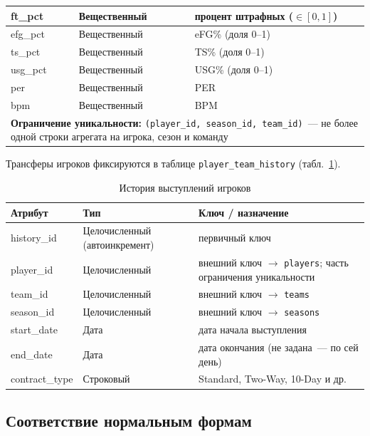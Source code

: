 {\begin{table}[H]
\begin{tabular}{|p{}|p{}|p{}|}
\hline
ft\_pct & Вещественный & процент штрафных ($\in [0,1]$) \\
\hline
efg\_pct & Вещественный & eFG\% (доля 0--1) \\
\hline
ts\_pct & Вещественный & TS\% (доля 0--1) \\
\hline
usg\_pct & Вещественный & USG\% (доля 0--1) \\
\hline
per & Вещественный & PER \\
\hline
bpm & Вещественный & BPM \\
\hline
\multicolumn{3}{|p{\dimexpr\textwidth-2\tabcolsep-2\arrayrulewidth\relax}|}{%
\textbf{Ограничение уникальности:} \texttt{(player\_id, season\_id, team\_id)}~---
не более одной строки агрегата на игрока, сезон и команду} \\
\hline
\end{tabular}
\end{table}

{\normalsize
Трансферы игроков фиксируются в таблице
\texttt{player\_team\_history} (табл.~\ref{tab:pth}).
}

\begin{table}[H]
\caption{История выступлений игроков}
\label{tab:pth}
\centering
\begin{tabular}{|p{}|p{}|p{}|}
\hline
\textbf{Атрибут} & \textbf{Тип} & \textbf{Ключ / назначение} \\
\hline
history\_id & Целочисленный (автоинкремент) & первичный ключ \\
\hline
player\_id & Целочисленный & внешний ключ $\rightarrow$ \texttt{players}; часть ограничения уникальности \\
\hline
team\_id & Целочисленный & внешний ключ $\rightarrow$ \texttt{teams} \\
\hline
season\_id & Целочисленный & внешний ключ $\rightarrow$ \texttt{seasons} \\
\hline
start\_date & Дата & дата начала выступления \\
\hline
end\_date & Дата & дата окончания (не задана~--- по сей день) \\
\hline
contract\_type & Строковый & Standard, Two-Way, 10-Day и др. \\
\hline
\end{tabular}
\end{table}
} %

\subsection{Соответствие нормальным формам}


